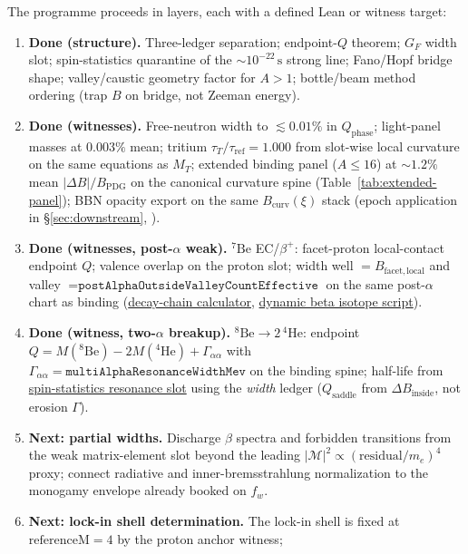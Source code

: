 \documentclass[11pt,notitlepage]{amsart}
\begin{document}
The programme proceeds in layers, each with a defined Lean or witness target:
\begin{enumerate}[label=\arabic*., leftmargin=2.2em, labelsep=0.55em, itemsep=0.45em]
\item \textbf{Done (structure).}
  Three-ledger separation; endpoint-$Q$ theorem; $G_F$ width slot;
  spin-statistics quarantine of the $\sim 10^{-22}\,\mathrm{s}$ strong line;
  Fano/Hopf bridge shape; valley/caustic geometry factor for $A>1$;
  bottle/beam method ordering (trap $B$ on bridge, not Zeeman energy).
\item \textbf{Done (witnesses).}
  Free-neutron width to $\lesssim 0.01\%$ in $Q_{\mathrm{phase}}$;
  light-panel masses at $0.003\%$ mean; tritium $\tau_T/\tau_{\mathrm{ref}}=1.000$ from
  slot-wise local curvature on the same equations as $M_T$;
  extended binding panel ($A\le 16$) at $\sim 1.2\%$ mean $|\Delta B|/B_{\mathrm{PDG}}$
  on the canonical curvature spine (Table~\ref{tab:extended-panel});
  BBN opacity export on the same $B_{\mathrm{curv}}(\xi)$
  stack (epoch application in \S\ref{sec:downstream}, \cite{hqiv-bbn-paper}).
\item \textbf{Done (witnesses, post-$\alpha$ weak).}
  $^7\mathrm{Be}$ EC/$\beta^+$: facet-proton local-contact endpoint $Q$; valence
  overlap on the proton slot; width well $=B_{\mathrm{facet,local}}$ and valley
  $=\texttt{postAlphaOutsideValleyCountEffective}$ on the same post-$\alpha$ chart as
  binding (\hyperref[script:decay-chain]{decay-chain calculator},
  \hyperref[script:dynamic-beta]{dynamic beta isotope script}).
\item \textbf{Done (witness, two-$\alpha$ breakup).}
  $^8\mathrm{Be}\to 2\,{}^4\mathrm{He}$: endpoint
  $Q=M({}^8\mathrm{Be})-2M({}^4\mathrm{He})+\Gamma_{\alpha\alpha}$ with
  $\Gamma_{\alpha\alpha}=\texttt{multiAlphaResonanceWidthMev}$ on the binding spine;
  half-life from \hyperref[lean:spin-stats-half-life]{spin-statistics resonance slot}
  using the \emph{width} ledger
  ($Q_{\mathrm{saddle}}$ from $\Delta B_{\mathrm{inside}}$, not erosion $\Gamma$).
\item \textbf{Next: partial widths.}
  Discharge $\beta$ spectra and forbidden transitions from the weak matrix-element
  slot beyond the leading $|\mathcal{M}|^2\propto(\mathrm{residual}/m_e)^4$ proxy;
  connect radiative and inner-bremsstrahlung normalization to the monogamy envelope
  already booked on $f_w$.
\item \textbf{Next: lock-in shell determination.}
  The lock-in shell is fixed at $\mathrm{referenceM}=4$ by the proton anchor witness;

\end{enumerate}
\end{document}
